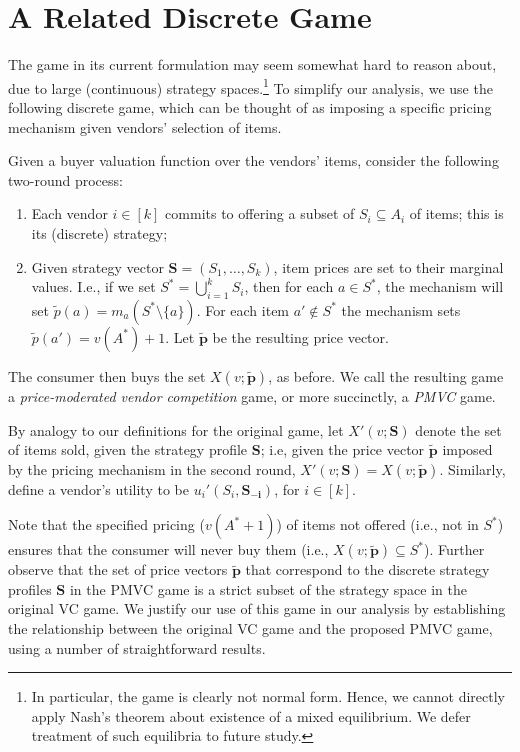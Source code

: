 \section{A Related Discrete Game}
\label{sec:discretization}

The game in its current formulation may seem somewhat hard to reason about, due
to large (continuous) strategy spaces.\footnote{In particular, the game is
clearly not normal form. Hence, we cannot directly apply Nash's theorem
about existence of a mixed equilibrium. We defer treatment of such
equilibria to future study.} To simplify our analysis, we use the
following discrete game, which can be thought of as imposing 
a specific pricing mechanism given vendors' selection of
items.

\begin{definition}
\label{def:pm-vc}
Given a buyer valuation function over the vendors' items, consider the 
following two-round process:
\begin{enumerate}
\item Each vendor $i \in [k]$ commits to offering
a subset of $S_i \subseteq A_i$ of items; this is its (discrete) strategy;
\item Given strategy vector $\mathbf{S}=(S_1,\ldots,S_k)$, item prices are set to their marginal values. I.e., if we set $S^* = \bigcup_{i=1}^kS_i$, then for each $a \in S^*$, the mechanism will set $\tilde p (a)=m_a(S^* \setminus \{ a \})$. For each item $a' \notin S^*$ the mechanism sets $\tilde p(a') = v(A^*)+1$. Let $\mathbf{\tilde p}$ be the resulting price vector.
\end{enumerate}
The consumer then buys the set $X(v;\mathbf{\tilde p})$, as before. 
We call the resulting game a \emph{price-moderated vendor competition} game, or more succinctly, a \emph{PMVC} game.
\end{definition}
By analogy to our definitions for the original game, let $X'(v;\mathbf{S})$ denote the set of items sold, given the strategy profile $\mathbf{S}$; i.e, given the price vector $\mathbf{\tilde p}$ imposed by the pricing mechanism in the second round, $X'(v;\mathbf{S}) = X(v;\mathbf{\tilde p})$. Similarly, define a vendor's utility to be $u_i'(S_i,\mathbf{S_{-i}})$, for $i \in [k]$.

Note that the specified pricing ($v(A^{*}+1)$) of items not offered (i.e., not in $S^*$) ensures that the consumer will never buy them (i.e., $X(v;\mathbf{\tilde p}) \subseteq S^*$).
Further observe that the set of price vectors $\mathbf{\tilde p}$ that correspond to the discrete strategy profiles $\mathbf{S}$ in the PMVC game is a strict subset of the strategy space in the original VC game.
We justify our use of this game in our analysis by establishing the relationship between the original VC game and the proposed PMVC game, using a number of straightforward results.

